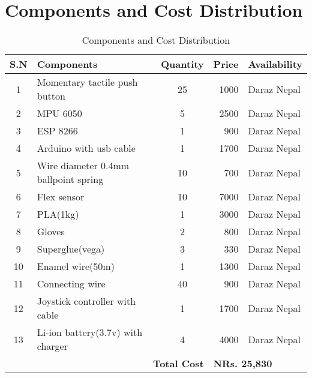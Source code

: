 \section*{Components and Cost Distribution}
\begin{table}[h]
\centering
\begin{tabular}{|c|l|c|r|l|}
\hline
\textbf{S.N} & \textbf{Components} & \textbf{Quantity} & \textbf{Price} & \textbf{Availability} \\
\hline
1 & Momentary tactile push button & 25 & 1000 & Daraz Nepal \\
\hline

2 & MPU 6050 & 5 & 2500 & Daraz Nepal \\
\hline
3 & ESP 8266 & 1 & 900 & Daraz Nepal \\
\hline
4 & Arduino with usb cable & 1 & 1700 & Daraz Nepal \\
\hline
5 & Wire diameter 0.4mm ballpoint spring & 10 & 700 & Daraz Nepal \\
\hline
6 & Flex sensor & 10 & 7000 & Daraz Nepal \\
\hline
7 & PLA(1kg) & 1 & 3000 & Daraz Nepal \\
\hline
8 & Gloves & 2 & 800 & Daraz Nepal \\
\hline
9 & Superglue(vega) & 3 & 330 & Daraz Nepal \\
\hline
10 & Enamel wire(50m) & 1 & 1300 & Daraz Nepal \\
\hline
11 & Connecting wire & 40 & 900 & Daraz Nepal \\
\hline
12 & Joystick controller with cable & 1 & 1700 & Daraz Nepal \\
\hline
13 & Li-ion battery(3.7v) with charger & 4 & 4000 & Daraz Nepal \\
\hline
\multicolumn{3}{|r|}{\textbf{Total Cost}} & \multicolumn{2}{l|}{\textbf{NRs. 25,830}} \\
\hline
\end{tabular}
\caption{Components and Cost Distribution}
\end{table}